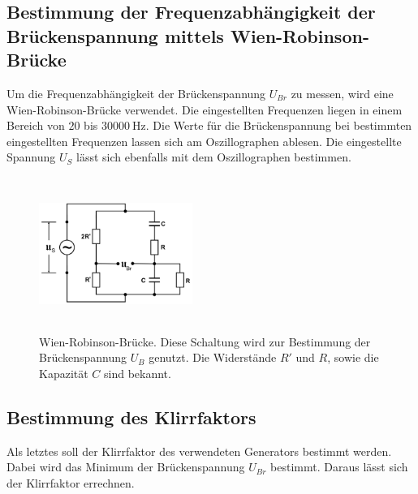 \subsection{Bestimmung der Frequenzabhängigkeit der Brückenspannung mittels Wien-Robinson-Brücke}
Um die Frequenzabhängigkeit der Brückenspannung $U_{Br}$ zu messen, wird eine 
Wien-Robinson-Brücke verwendet.
\newline
Die eingestellten Frequenzen liegen in einem Bereich von $\num{20}$ bis $\SI{30000}{\hertz}$.
Die Werte für die Brückenspannung bei bestimmten eingestellten Frequenzen
lassen sich am Oszillographen ablesen. %
Die eingestellte Spannung $U_S$ lässt sich ebenfalls mit dem Oszillographen
bestimmen.
\begin{figure}
    \centering
    \includegraphics[width=5cm, height=5cm]{build/wien-robinson.png}
    \caption{Wien-Robinson-Brücke. Diese Schaltung wird zur Bestimmung
    der Brückenspannung $U_B$ genutzt. Die Widerstände $R'$ und $R$,
    sowie die Kapazität $C$ sind bekannt.}
    \label{wien-robinson}
\end{figure}

\subsection{Bestimmung des Klirrfaktors}
Als letztes soll der Klirrfaktor des verwendeten Generators bestimmt werden.
\newline
Dabei wird das Minimum der Brückenspannung $U_{Br}$ bestimmt.
Daraus lässt sich der Klirrfaktor errechnen.

